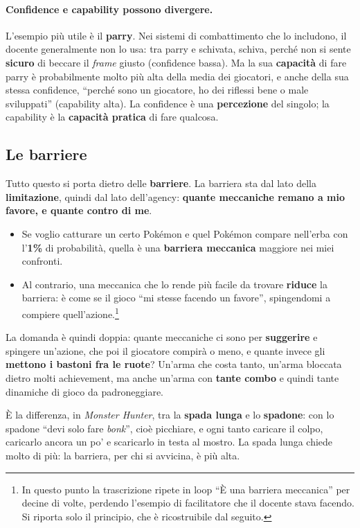 \paragraph{Confidence e capability possono divergere.} L'esempio più utile è
il \textbf{parry}. Nei sistemi di combattimento che lo includono, il docente
generalmente non lo usa: tra parry e schivata, schiva, perché non si sente
\textbf{sicuro} di beccare il \emph{frame} giusto (confidence bassa). Ma la
sua \textbf{capacità} di fare parry è probabilmente molto più alta della media
dei giocatori, e anche della sua stessa confidence, ``perché sono un
giocatore, ho dei riflessi bene o male sviluppati'' (capability alta). La
confidence è una \textbf{percezione} del singolo; la capability è la
\textbf{capacità pratica} di fare qualcosa.

\subsection{Le barriere}
\label{gd9:sec:tpb-barriere}

Tutto questo si porta dietro delle \textbf{barriere}. La barriera sta dal lato
della \textbf{limitazione}, quindi dal lato dell'agency: \textbf{quante
meccaniche remano a mio favore, e quante contro di me}.
\begin{itemize}
  \item Se voglio catturare un certo Pokémon e quel Pokémon compare
        nell'erba con l'\textbf{1\%} di probabilità, quella è una
        \textbf{barriera meccanica} maggiore nei miei confronti.
  \item Al contrario, una meccanica che lo rende più facile da trovare
        \textbf{riduce} la barriera: è come se il gioco ``mi stesse facendo un
        favore'', spingendomi a compiere quell'azione.\footnote{In questo
        punto la trascrizione ripete in loop ``È una barriera meccanica'' per
        decine di volte, perdendo l'esempio di facilitatore che il docente
        stava facendo. Si riporta solo il principio, che è ricostruibile dal
        seguito.}
\end{itemize}
La domanda è quindi doppia: quante meccaniche ci sono per
\textbf{suggerire} e spingere un'azione, che poi il giocatore compirà o
meno, e quante invece gli \textbf{mettono i bastoni fra le ruote}? Un'arma che
costa tanto, un'arma bloccata dietro molti achievement, ma anche un'arma con
\textbf{tante combo} e quindi tante dinamiche di gioco da padroneggiare.

È la differenza, in \emph{Monster Hunter}, tra la \textbf{spada lunga} e lo
\textbf{spadone}: con lo spadone ``devi solo fare \emph{bonk}'', cioè
picchiare, e ogni tanto caricare il colpo, caricarlo ancora un po' e
scaricarlo in testa al mostro. La spada lunga chiede molto di più: la
barriera, per chi si avvicina, è più alta.

